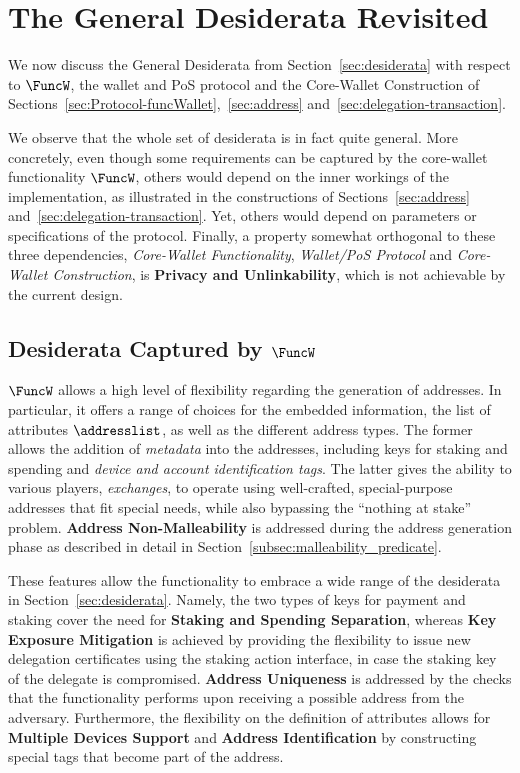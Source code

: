 \section{The General Desiderata Revisited}\label{sec:desiderata-revisited}
We now discuss the General Desiderata from Section~\ref{sec:desiderata} with respect to $\FuncW$, the wallet and PoS protocol and the Core-Wallet Construction of Sections~\ref{sec:Protocol-funcWallet},~\ref{sec:address} and~\ref{sec:delegation-transaction}.

We observe that the whole set of desiderata is in fact quite general. More concretely, even though some requirements can be captured by the core-wallet functionality $\FuncW$, others would depend on the inner workings of the implementation, as illustrated in the constructions of Sections~\ref{sec:address} and~\ref{sec:delegation-transaction}. Yet, others would depend on parameters or specifications of the protocol. Finally, a property somewhat orthogonal to these three dependencies, \ie \textit{Core-Wallet Functionality}, \textit{Wallet/PoS Protocol} and \textit{Core-Wallet Construction}, is {\bf Privacy and Unlinkability}, which is not achievable by the current design.


\subsection{Desiderata Captured by $\FuncW$}

$\FuncW$ allows a high level of flexibility regarding the generation of addresses. In particular, it offers a range of choices for the embedded information, \ie the list of attributes $\addresslist$, as well as the different address types. The former allows the addition of \textit{metadata} into the addresses, including keys for staking and spending and \textit{device and account identification tags}. The latter gives the ability to various players, \eg \textit{exchanges}, to operate using well-crafted, special-purpose addresses that fit special needs, while also bypassing the ``nothing at stake'' problem. {\bf Address Non-Malleability} is addressed during the address generation phase as described in detail in Section~\ref{subsec:malleability_predicate}.

These features allow the functionality to embrace a wide range of the desiderata in Section~\ref{sec:desiderata}. Namely, the two types of keys for payment and staking cover the need for {\bf Staking and Spending Separation}, whereas {\bf Key Exposure Mitigation} is achieved by providing the flexibility to issue new delegation certificates using the staking action interface, in case the staking key of the delegate is compromised. {\bf Address Uniqueness} is addressed by the checks that the functionality performs upon receiving a possible address from the adversary. Furthermore, the flexibility on the definition of attributes allows for {\bf Multiple Devices Support} and {\bf Address Identification} by constructing special tags that become part of the address.

